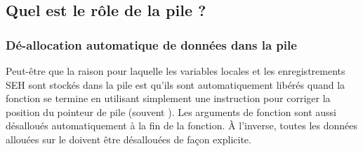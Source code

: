 
\subsection{Quel est le rôle de la pile ?}








\subsubsection{Dé-allocation automatique de données dans la pile}

Peut-être que la raison pour laquelle les variables locales et les enregistrements SEH sont stockés dans la
pile est qu'ils sont automatiquement libérés quand la fonction se termine en utilisant simplement une
instruction pour corriger la position du pointeur de pile (souvent \ADD).
Les arguments de fonction sont aussi désalloués automatiquement à la fin de la fonction.
À l'inverse, toutes les données allouées sur le  doivent être désallouées de façon explicite.





